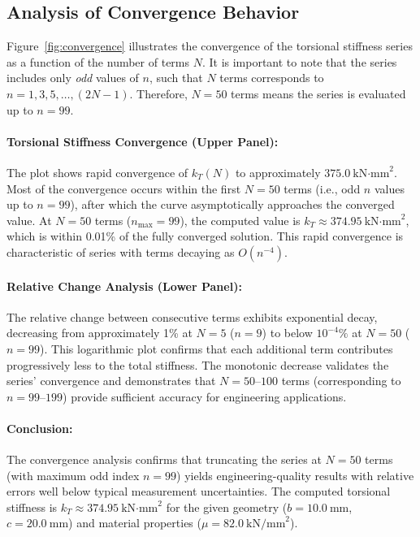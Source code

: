 
\subsection*{Analysis of Convergence Behavior}

Figure~\ref{fig:convergence} illustrates the convergence of the torsional stiffness series as a function of the number of terms $N$. It is important to note that the series includes only \textit{odd} values of $n$, such that $N$ terms corresponds to $n = 1, 3, 5, \ldots, (2N-1)$. Therefore, $N=50$ terms means the series is evaluated up to $n=99$.

\paragraph{Torsional Stiffness Convergence (Upper Panel):}
The plot shows rapid convergence of $k_T(N)$ to approximately $375.0~\text{kN·mm}^2$. Most of the convergence occurs within the first $N = 50$ terms (i.e., odd $n$ values up to $n=99$), after which the curve asymptotically approaches the converged value. At $N = 50$ terms ($n_{\text{max}}=99$), the computed value is $k_T \approx 374.95~\text{kN·mm}^2$, which is within 0.01\% of the fully converged solution. This rapid convergence is characteristic of series with terms decaying as $O(n^{-4})$.

\paragraph{Relative Change Analysis (Lower Panel):}
The relative change between consecutive terms exhibits exponential decay, decreasing from approximately 1\% at $N = 5$ ($n=9$) to below $10^{-4}\%$ at $N = 50$ ($n=99$). This logarithmic plot confirms that each additional term contributes progressively less to the total stiffness. The monotonic decrease validates the series' convergence and demonstrates that $N = 50$--$100$ terms (corresponding to $n = 99$--$199$) provide sufficient accuracy for engineering applications.

\paragraph{Conclusion:}
The convergence analysis confirms that truncating the series at $N = 50$ terms (with maximum odd index $n=99$) yields engineering-quality results with relative errors well below typical measurement uncertainties. The computed torsional stiffness is $k_T \approx 374.95~\text{kN·mm}^2$ for the given geometry ($b = 10.0~\text{mm}$, $c = 20.0~\text{mm}$) and material properties ($\mu = 82.0~\text{kN/mm}^2$).

